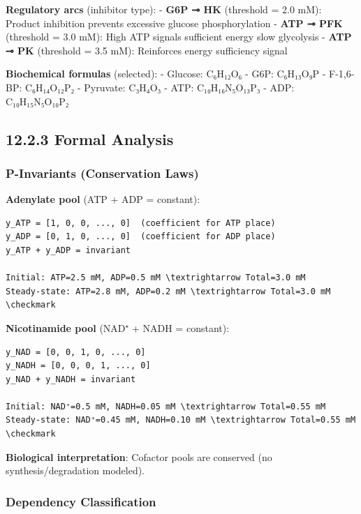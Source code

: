 \textbf{Regulatory arcs} (inhibitor type): - \textbf{G6P ⊸ HK}
(threshold = 2.0 mM): Product inhibition prevents excessive glucose
phosphorylation - \textbf{ATP ⊸ PFK} (threshold = 3.0 mM): High ATP
signals sufficient energy \textrightarrow slow glycolysis - \textbf{ATP ⊸ PK}
(threshold = 3.5 mM): Reinforces energy sufficiency signal

\textbf{Biochemical formulas} (selected): - Glucose: C₆H₁₂O₆ - G6P:
C₆H₁₃O₉P - F-1,6-BP: C₆H₁₄O₁₂P₂ - Pyruvate: C₃H₄O₃ - ATP: C₁₀H₁₆N₅O₁₃P₃
- ADP: C₁₀H₁₅N₅O₁₀P₂

\hypertarget{formal-analysis}{%
\subsection{12.2.3 Formal Analysis}\label{formal-analysis}}

\hypertarget{p-invariants-conservation-laws}{%
\subsubsection{P-Invariants (Conservation
Laws)}\label{p-invariants-conservation-laws}}

\textbf{Adenylate pool} (ATP + ADP = constant):

\begin{lstlisting}
y_ATP = [1, 0, 0, ..., 0]  (coefficient for ATP place)
y_ADP = [0, 1, 0, ..., 0]  (coefficient for ADP place)
y_ATP + y_ADP = invariant

Initial: ATP=2.5 mM, ADP=0.5 mM \textrightarrow Total=3.0 mM
Steady-state: ATP=2.8 mM, ADP=0.2 mM \textrightarrow Total=3.0 mM \checkmark
\end{lstlisting}

\textbf{Nicotinamide pool} (NAD⁺ + NADH = constant):

\begin{lstlisting}
y_NAD = [0, 0, 1, 0, ..., 0]
y_NADH = [0, 0, 0, 1, ..., 0]
y_NAD + y_NADH = invariant

Initial: NAD⁺=0.5 mM, NADH=0.05 mM \textrightarrow Total=0.55 mM
Steady-state: NAD⁺=0.45 mM, NADH=0.10 mM \textrightarrow Total=0.55 mM \checkmark
\end{lstlisting}

\textbf{Biological interpretation}: Cofactor pools are conserved (no
synthesis/degradation modeled).

\hypertarget{dependency-classification}{%
\subsubsection{Dependency
Classification}\label{dependency-classification}}

